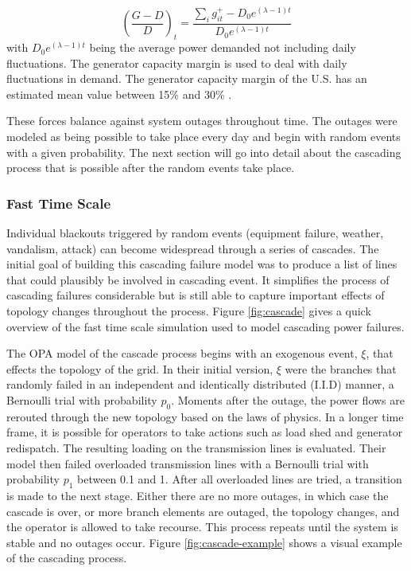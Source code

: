 \begin{enumerate}
\begin{equation}
\left(\frac{G-D}{D}\right)_t = \frac{\sum_i g_{it}^+ - D_0 e^{(\lambda-1)t} }{D_0 e^{(\lambda-1)t}}
\end{equation}
with $D_0 e^{(\lambda-1)t}$ being the average power demanded not including daily fluctuations.  The generator capacity margin is used to deal with daily fluctuations in demand.  The generator capacity margin of the U.S. has an estimated mean value between 15\% and 30\% \cite{carreras_2004}.
\end{enumerate}

These forces balance against system outages throughout time.  The outages were modeled as being possible to take place every day and begin with random events with a given probability.  The next section will go into detail about the cascading process that is possible after the random events take place.

\subsubsection{Fast Time Scale}

Individual blackouts triggered by random events (equipment failure, weather, vandalism, attack) can become widespread through a series of cascades. 
The initial goal of building this cascading failure model was to produce a list of lines that could plausibly be involved in cascading event.  It simplifies the process of cascading failures considerable but is still able to capture important effects of topology changes throughout the process.  Figure \ref{fig:cascade} gives a quick overview of the fast time scale simulation used to model cascading power failures.



The OPA model of the cascade process begins with an exogenous event, $\xi$, that effects the topology of the grid.  In their initial version, $\xi$ were the branches that randomly failed in an independent and identically distributed (I.I.D) manner, a Bernoulli trial with probability $p_0$.  Moments after the outage, the power flows are rerouted through the new topology based on the laws of physics.  In a longer time frame, it is possible for operators to take actions such as load shed and generator redispatch.  The resulting loading on the transmission lines is evaluated.  Their model then failed overloaded transmission lines with a Bernoulli trial with probability $p_1$ between  0.1 and 1.  After all overloaded lines are tried, a transition is made to the next stage.  Either there are no more outages, in which case the cascade is over, or more branch elements are outaged, the topology changes, and the operator is allowed to take recourse.  This process repeats until the system is stable and no outages occur.  Figure \ref{fig:cascade-example} shows a visual example of the cascading process.

